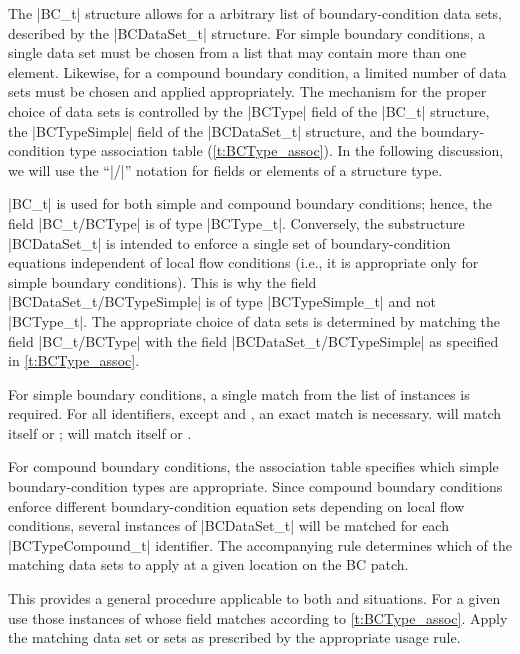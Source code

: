 \enlargethispage{\baselineskip}
The |BC_t| structure allows for a arbitrary list of boundary-condition
data sets, described by the |BCDataSet_t| structure.  For simple
boundary conditions, a single data set must be chosen from a list
that may contain more than one element.  Likewise, for a compound
boundary condition, a limited number of data sets must be chosen
and applied appropriately.  The mechanism for the proper choice of data
sets is controlled by the |BCType| field of the |BC_t| structure,
the |BCTypeSimple| field of the |BCDataSet_t| structure, and the
boundary-condition type association table (\autoref{t:BCType_assoc}).
In the following discussion, we will use the ``|/|'' notation for fields
or elements of a structure type.

|BC_t| is used for both simple and compound boundary conditions; hence,
the field |BC_t/BCType| is of type |BCType_t|.
Conversely, the substructure |BCDataSet_t| is intended to enforce a
single set of boundary-condition equations independent of local flow
conditions (i.e., it is appropriate only for simple boundary conditions).
This is why the field |BCDataSet_t/BCTypeSimple| is of type
|BCTypeSimple_t| and not |BCType_t|.
The appropriate choice of data sets is determined by matching the field
|BC_t/BCType| with the field |BCDataSet_t/BCTypeSimple| as specified in 
\autoref{t:BCType_assoc}.

For simple boundary conditions, a single match from the list of
 instances is required.
For all  identifiers, except
 and , an exact match
is necessary.
 will match itself or ;
 will match itself or .

For compound boundary conditions, the association table specifies which
simple boundary-condition types are appropriate.
Since compound boundary conditions enforce different boundary-condition
equation sets depending on local flow conditions, several instances of
|BCDataSet_t| will be matched for each |BCTypeCompound_t| identifier.
The accompanying rule determines which of the matching data sets to
apply at a given location on the BC patch.

This provides a general procedure applicable to both 
and  situations.
For a given  use those instances of 
whose field  matches according to
\autoref{t:BCType_assoc}.
Apply the matching data set or sets as prescribed by the appropriate
usage rule.

